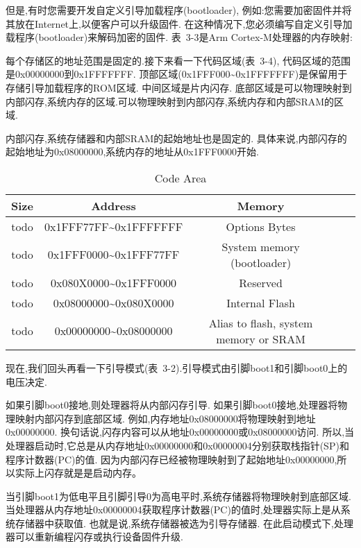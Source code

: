但是,有时您需要开发自定义引导加载程序(bootloader),
例如:您需要加密固件并将其放在Internet上,以便客户可以升级固件.
在这种情况下,您必须编写自定义引导加载程序(bootloader)来解码加密的固件.
表~3-3是Arm Cortex-M处理器的内存映射:


每个存储区的地址范围是固定的.接下来看一下代码区域(表~3-4),
代码区域的范围是0x00000000到0x1FFFFFFF.
顶部区域(0x1FFF000\textasciitilde0x1FFFFFFF)是保留用于存储引导加载程序的ROM区域.
中间区域是片内闪存.
底部区域是可以物理映射到内部闪存,系统内存的区域.可以物理映射到内部闪存,系统内存和内部SRAM的区域.

内部闪存,系统存储器和内部SRAM的起始地址也是固定的.
具体来说,内部闪存的起始地址为0x08000000,系统内存的地址从0x1FFF0000开始.
\begin{table}[htbp]
    \caption{ Code Area }\label{tab:table1}
    \vspace{0.5em}\centering\wuhao
    \begin{tabular}{ccccc}
    \toprule[1.5pt]
    Size & Address & Memory \\
    \midrule[1pt]
    todo & 0x1FFF77FF\textasciitilde0x1FFFFFFF & Options Bytes \\
    todo & 0x1FFF0000\textasciitilde0x1FFF77FF & System memory (bootloader)\\
    todo & 0x080X0000\textasciitilde0x1FFF0000 & Reserved \\
    todo & 0x08000000\textasciitilde0x080X0000 & Internal Flash \\
    todo & 0x00000000\textasciitilde0x08000000 & Alias to flash, system memory or SRAM \\
  
    \bottomrule[1.5pt]
    \end{tabular}
    \vspace{\baselineskip}
    \end{table}

现在,我们回头再看一下引导模式(表~3-2).引导模式由引脚boot1和引脚boot0上的电压决定.

如果引脚boot0接地,则处理器将从内部闪存引导.
如果引脚boot0接地,处理器将物理映射内部闪存到底部区域.
例如,内存地址0x08000000将物理映射到地址0x00000000.
换句话说,闪存内容可以从地址0x00000000或0x08000000访问.
所以,当处理器启动时,它总是从内存地址0x00000000和0x00000004分别获取栈指针(SP)和程序计数器(PC)的值.
因为内部闪存已经被物理映射到了起始地址0x00000000,所以实际上闪存就是是启动内存。

当引脚boot1为低电平且引脚引导0为高电平时,系统存储器将物理映射到底部区域.
当处理器从内存地址0x00000004获取程序计数器(PC)的值时,处理器实际上是从系统存储器中获取值.
也就是说,系统存储器被选为引导存储器.
在此启动模式下,处理器可以重新编程闪存或执行设备固件升级.

